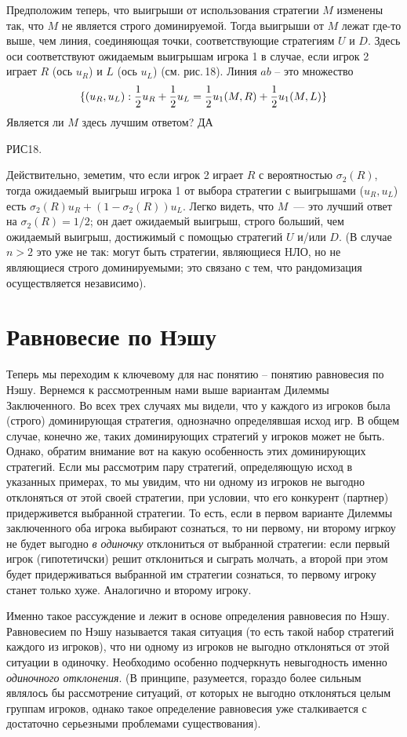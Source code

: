 Предположим теперь, что выигрыши от использования стратегии $M$
изменены так, что $M$ не является строго доминируемой. Тогда
выигрыши от $M$ лежат где-то выше, чем линия, соединяющая точки,
соответствующие стратегиям $U$ и $D$. Здесь оси соответствуют
ожидаемым выигрышам игрока 1 в случае, если игрок 2 играет $R$ (ось
$u_R$) и $L$ (ось $u_L$) (см. рис.\,18). Линия $ab$ -- это множество
$$
\{(u_R,u_L):{1\over 2}u_R+{1\over 2}u_L= {1\over 2}u_1(M,R)+{1\over
2}u_1(M,L)\}
$$
Является ли $M$ здесь лучшим ответом? ДА


РИС18.


Действительно, земетим, что если игрок 2 играет $R$ с вероятностью
$\sigma_2(R)$, тогда ожидаемый выигрыш игрока 1 от выбора стратегии
с выигрышами ($u_R,u_L$) есть $\sigma_2(R)u_R+(1-\sigma_2(R))u_L$.
Легко видеть, что $M$~--- это лучший ответ на $\sigma_2(R)=1/2$; он
дает ожидаемый выигрыш, строго больший, чем ожидаемый выигрыш,
достижимый с помощью стратегий $U$ и/или $D$. (В случае $n>2$ это
уже не так: могут быть стратегии, являющиеся HЛО, но не являющиеся
строго доминируемыми; это связано с тем, что  рандомизация
осуществляется независимо).


\section{Равновесие по Нэшу}

Теперь мы переходим к ключевому для нас понятию -- понятию
равновесия по Нэшу. Вернемся к рассмотренным нами выше вариантам
Дилеммы Заключенного. Во всех трех случаях мы видели, что у каждого
из игроков была (строго) доминирующая стратегия, однозначно
определявшая исход игр. В общем случае, конечно же, таких
доминирующих стратегий у игроков может не быть. Однако, обратим
внимание вот на какую особенность этих доминирующих стратегий. Если
мы рассмотрим пару стратегий, определяющую исход в указанных
примерах, то мы увидим, что ни одному из игроков не выгодно
отклоняться от этой своей стратегии, при условии, что его конкурент
(партнер) придерживется выбранной стратегии. То есть, если в первом
варианте Дилеммы заключенного оба игрока выбирают сознаться, то ни
первому, ни второму игркоу не будет выгодно \emph{в одиночку}
отклониться от выбранной стратегии: если первый игрок (гипотетичски)
решит отклониться и сыграть молчать, а второй при этом будет
придерживаться выбранной им стратегии сознаться, то первому игроку
станет только хуже. Аналогично и второму игроку.

Именно такое рассуждение и лежит в основе определения равновесия по
Нэшу. Равновесием по Нэшу называется такая ситуация (то есть такой
набор стратегий каждого из игроков), что ни одному из игроков не
выгодно отклоняться от этой ситуации в одиночку. Необходимо особенно
подчеркнуть невыгодность именно \emph{одиночного отклонения}. (В
принципе, разумеется, гораздо более сильным являлось бы рассмотрение
ситуаций, от которых не выгодно отклоняться целым группам игроков,
однако такое определение равновесия уже сталкивается с достаточно
серьезными проблемами существования).

